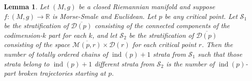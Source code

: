 \documentclass[psamsfonts]{amsart}
\newtheorem{lemma}[theorem]{Lemma}
\theoremstyle{remark}
\DeclareMathOperator{\ind}{ind}
\begin{document}
\begin{lemma}\label{gray}
Let $(M, g)$ be a closed Riemannian manifold and suppose $f : (M, g) \rightarrow \mathbb{R}$ is Morse-Smale and Euclidean.  Let $p$ be any critical point.  Let $\mathcal{S}_1$ be the stratification of $\overline{\mathcal{D}(p)}$ consisting of the connected components of the codimension-$k$ part for each $k$, and let $\mathcal{S}_2$ be the stratification of $\overline{\mathcal{D}(p)}$ consisting of the space $\overline{\mathcal{M}(p, r)} \times \mathcal{D}(r)$ for each critical point $r$.  Then the number of totally ordered chains of $\ind(p)+1$ strata from $\mathcal{S}_1$ such that those strata belong to $\ind(p)+1$ different strata from $\mathcal{S}_2$ is the number of $\ind(p)$-part broken trajectories starting at $p$.
\end{lemma}
\end{document}
